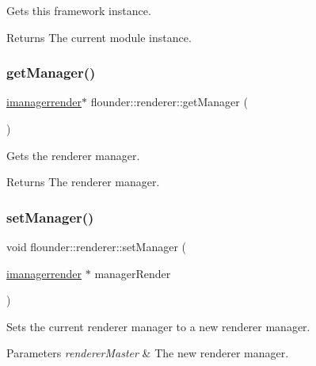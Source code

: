 Gets this framework instance. 

\begin{DoxyReturn}{Returns}
The current module instance. 
\end{DoxyReturn}
\mbox{\label{classflounder_1_1renderer_ad2d55b317665b9b64f91d03984eea226}} 
\subsubsection{\texorpdfstring{get\+Manager()}{getManager()}}
{\footnotesize\ttfamily \hyperlink{classflounder_1_1imanagerrender}{imanagerrender}$\ast$ flounder\+::renderer\+::get\+Manager (\begin{DoxyParamCaption}{ }\end{DoxyParamCaption})\hspace{0.3cm}{\ttfamily [inline]}}



Gets the renderer manager. 

\begin{DoxyReturn}{Returns}
The renderer manager. 
\end{DoxyReturn}
\mbox{\label{classflounder_1_1renderer_ab4b504ed530f9a6df2327a942ccd9d70}} 
\subsubsection{\texorpdfstring{set\+Manager()}{setManager()}}
{\footnotesize\ttfamily void flounder\+::renderer\+::set\+Manager (\begin{DoxyParamCaption}\item[{\hyperlink{classflounder_1_1imanagerrender}{imanagerrender} $\ast$}]{manager\+Render }\end{DoxyParamCaption})\hspace{0.3cm}{\ttfamily [inline]}}



Sets the current renderer manager to a new renderer manager. 


\begin{DoxyParams}{Parameters}
{\em renderer\+Master} & The new renderer manager. \\
\hline
\end{DoxyParams}
\mbox{\label{classflounder_1_1renderer_aae85f1462ba4e9eb7899483536fdb0c5}} 
